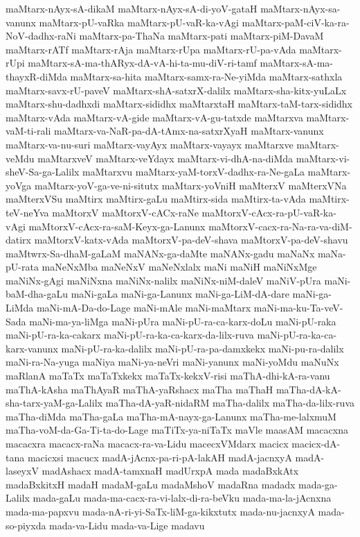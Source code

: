 {maMtarx-nAyx-sA-dikaM
maMtarx-nAyx-sA-di-yoV-gataH
maMtarx-nAyx-sa-vanunx
maMtarx-pU-vaRka
maMtarx-pU-vaR-ka-vAgi
maMtarx-paM-ciV-ka-ra-NoV-dadhx-raNi
maMtarx-pa-ThaNa
maMtarx-pati
maMtarx-piM-DavaM
maMtarx-rATf
maMtarx-rAja
maMtarx-rUpa
maMtarx-rU-pa-vAda
maMtarx-rUpi
maMtarx-sA-ma-thARyx-dA-vA-hi-ta-mu-diV-ri-tamf
maMtarx-sA-ma-thayxR-diMda
maMtarx-sa-hita
maMtarx-samx-ra-Ne-yiMda
maMtarx-sathxla
maMtarx-savx-rU-paveV
maMtarx-shA-satxrX-dalilx
maMtarx-sha-kitx-yuLaLx
maMtarx-shu-dadhxdi
maMtarx-sididhx
maMtarxtaH
maMtarx-taM-tarx-sididhx
maMtarx-vAda
maMtarx-vA-gide
maMtarx-vA-gu-tatxde
maMtarxva
maMtarx-vaM-ti-rali
maMtarx-va-NaR-pa-dA-tAmx-na-satxrXyaH
maMtarx-vanunx
maMtarx-va-nu-suri
maMtarx-vayAyx
maMtarx-vayayx
maMtarxve
maMtarx-veMdu
maMtarxveV
maMtarx-veYdayx
maMtarx-vi-dhA-na-diMda
maMtarx-vi-sheV-Sa-ga-Lalilx
maMtarxvu
maMtarx-yaM-torxV-dadhx-ra-Ne-gaLa
maMtarx-yoVga
maMtarx-yoV-ga-ve-ni-situtx
maMtarx-yoVniH
maMterxV
maMterxVNa
maMterxVSu
maMtirx
maMtirx-gaLu
maMtirx-sida
maMtirx-ta-vAda
maMtirx-teV-neYva
maMtorxV
maMtorxV-cACx-raNe
maMtorxV-cAcx-ra-pU-vaR-ka-vAgi
maMtorxV-cAcx-ra-saM-Keyx-ga-Lanunx
maMtorxV-cacx-ra-Na-ra-va-diM-datirx
maMtorxV-katx-vAda
maMtorxV-pa-deV-shava
maMtorxV-pa-deV-shavu
maMtwrx-Sa-dhaM-gaLaM
maNANx-ga-daMte
maNANx-gadu
maNaNx
maNa-pU-rata
maNeNxMba
maNeNxV
maNeNxlalx
maNi
maNiH
maNiNxMge
maNiNx-gAgi
maNiNxna
maNiNx-nalilx
maNiNx-niM-daleV
maNiV-pUra
maNi-baM-dha-gaLu
maNi-gaLa
maNi-ga-Lanunx
maNi-ga-LiM-dA-dare
maNi-ga-LiMda
maNi-mA-Da-do-Lage
maNi-mAle
maNi-maMtarx
maNi-ma-ku-Ta-veV-Sada
maNi-ma-ya-liMga
maNi-pUra
maNi-pU-ra-ca-karx-doLu
maNi-pU-raka
maNi-pU-ra-ka-cakarx
maNi-pU-ra-ka-ca-karx-da-lilx-ruva
maNi-pU-ra-ka-ca-karx-vanunx
maNi-pU-ra-ka-dalilx
maNi-pU-ra-pa-damxkekx
maNi-pu-ra-dalilx
maNi-ra-Na-yuga
maNiya
maNi-ya-neVri
maNi-yanunx
maNi-yoMdu
maNuNx
maRlanA
maTaTx
maTaTxkekx
maTaTx-kekxV-risi
maThA-dhi-kA-ra-vanu
maThA-kAsha
maThAyaR
maThA-yaRshacx
maTha
maThaH
maTha-dA-kA-sha-tarx-yaM-ga-Lalilx
maTha-dA-yaR-nidaRM
maTha-dalilx
maTha-da-lilx-ruva
maTha-diMda
maTha-gaLa
maTha-mA-nayx-ga-Lanunx
maTha-me-lalxmuM
maTha-voM-da-Ga-Ti-ta-do-Lage
maTiTx-ya-niTaTx
maVle
maasAM
macacxna
macacxra
macacx-raNa
macacx-ra-va-Lidu
macecxVMdarx
macicx
macicx-dA-tana
macicxsi
macucx
madA-jAcnx-pa-ri-pA-lakAH
madA-jacnxyA
madA-laseyxV
madAshacx
madA-tamxnaH
madUrxpA
mada
madaBxkAtx
madaBxkitxH
madaH
madaM-gaLu
madaMshoV
madaRna
madadx
mada-ga-Lalilx
mada-gaLu
mada-ma-cacx-ra-vi-lalx-di-ra-beVku
mada-ma-la-jAcnxna
mada-ma-papxvu
mada-nA-ri-yi-SaTx-liM-ga-kikxtutx
mada-nu-jacnxyA
mada-so-piyxda
mada-va-Lidu
mada-va-Lige
madavu
}
